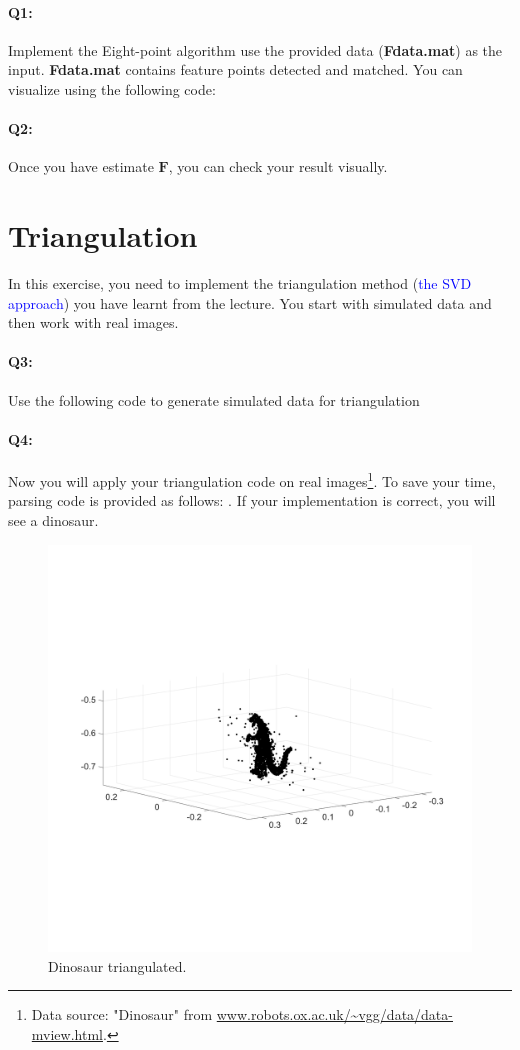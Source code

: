 \documentclass[a4paper]{article}
\begin{document}
\paragraph{Q1:} 
Implement the Eight-point algorithm use the provided data (\textbf{Fdata.mat}) as the input. \textbf{Fdata.mat} contains feature points detected and matched. You can visualize using the following code:

\paragraph{Q2:} 
Once you have estimate $\mathbf{F}$, you can check your result visually. 

\section{Triangulation}
In this exercise, you need to implement the triangulation method (\textcolor{blue}{the SVD approach}) you have learnt from the lecture. You start with simulated data and then work with real images.
\paragraph{Q3:} 
Use the following code to generate simulated data for triangulation


\paragraph{Q4:} 
Now you will apply your triangulation code on real images\footnote{Data source: "Dinosaur" from \url{www.robots.ox.ac.uk/~vgg/data/data-mview.html}.}. To save your time, parsing code is provided as follows:
. If your implementation is correct, you will see a dinosaur.
\begin{figure}[!b]
\centering
\includegraphics[scale=0.5]{figures/dino.png}
\caption{Dinosaur triangulated.}
\end{figure}
\end{document}

